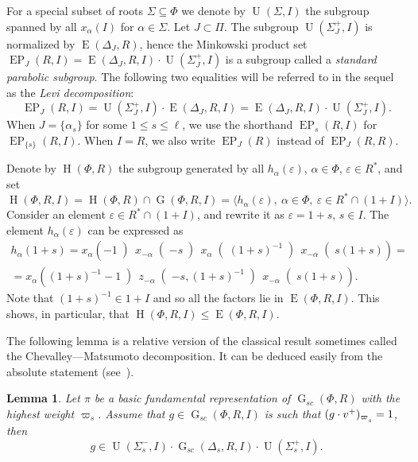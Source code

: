 \documentclass[oneside, 12pt]{amsart}
\theoremstyle{plain}
\numberwithin{equation}{section}
\newtheorem{lemma}{Lemma}
\numberwithin{lemma}{section}
\theoremstyle{definition}
\theoremstyle{remark}
\DeclareMathOperator{\G}{G}
\DeclareMathOperator{\E}{E}
\DeclareMathOperator{\EP}{EP}
\DeclareMathOperator{\Hh}{H}
\DeclareMathOperator{\U}{U}
\def\ssub#1{\mathchoice
   {_{\lower2pt\hbox{$\scriptstyle #1$}}}
   {_{\lower2pt\hbox{$\scriptstyle #1$}}}
   {_{\lower1.5pt\hbox{$\scriptscriptstyle #1$}}}
   {_{\!\lower1.5pt\hbox{$\scriptscriptstyle #1$}}}}
\begin{document}
For a special subset of roots $\Sigma\subseteq \Phi$ we denote by $\U(\Sigma, I)$ the subgroup spanned by all $x_{\alpha}(I)$ for $\alpha\in \Sigma$. Let $J\subset\Pi$.
The subgroup $\U(\Sigma_J^+, I)$ is normalized by $\E(\Delta_J, R)$, hence the Minkowski product set $\EP_J(R, I) = \E(\Delta_J, R, I) \cdot \U(\Sigma_J^+, I)$ is a subgroup called a \emph{standard parabolic subgroup}.
The following two equalities will be referred to in the sequel as the \emph{Levi decomposition}:
\begin{equation} \label{rel:Levi-decomp} \EP_J(R, I) = \U(\Sigma_J^+, I) \cdot \E(\Delta_J, R, I) = \E(\Delta_J, R, I) \cdot \U(\Sigma_J^+, I). \end{equation}
When $J = \{ \alpha_s \}$ for some $1 \leq s\leq \ell$, we use the shorthand $\EP_s(R, I)$ for $\EP_{\{s\}}(R, I)$.
When $I=R$, we also write $\EP_J(R)$ instead of $\EP_J(R, R)$.

Denote by $\Hh(\Phi, R)$ the subgroup generated by all $h_\alpha(\varepsilon)$, $\alpha\in\Phi$, $\varepsilon\in R^*$, and set
\[ \Hh(\Phi, R, I) = \Hh(\Phi, R)\cap\G(\Phi, R, I)=\langle h_\alpha(\varepsilon), \ \alpha\in\Phi, \ \varepsilon\in R^*\cap(1+I)\rangle. \]
Consider an element $\varepsilon\in R^*\cap(1+I)$, and rewrite it as $\varepsilon=1+s$, $s\in I$. The element $h_\alpha(\varepsilon)$ can be expressed as
\begin{multline} \label{eq:rel-tor-elementary}
h_\alpha(1+s) = x_\alpha\left(-1\middle)\, x_{-\alpha}\middle(-s\middle)\, x_\alpha\middle((1+s)^{-1}\middle)\, x_{-\alpha}\middle(s(1+s)\right) = \\
= x_\alpha\left((1+s)^{-1}-1\middle)\, z_{-\alpha}\middle(-s, (1+s)^{-1}\middle)\, x_{-\alpha}\middle(s(1+s)\right).
\end{multline}
Note that $(1+s)^{-1}\in 1+I$ and so all the factors lie in $\E(\Phi, R, I)$. This shows, in particular, that $\Hh(\Phi, R, I) \leqslant \E(\Phi, R, I)$.

The following lemma is a relative version of the classical result sometimes called the Chevalley---Matsumoto decomposition.
It can be deduced easily from the absolute statement (see~\cite[Theorem~1.3]{St78}).
\begin{lemma}\label{lemma:Chevalley-Matsumoto}
Let $\pi$ be a basic fundamental representation of $\G_{sc}(\Phi, R)$ with the highest weight $\varpi_s$.
Assume that $g\in \G_{sc}(\Phi, R, I)$ is such that $(g\cdot v^+)_{\varpi\ssub{s}}=1$, then 
\[ g \in \U(\Sigma_s^-, I) \cdot \G_{sc}(\Delta_s, R, I) \cdot \U(\Sigma_s^+, I). \]
\end{lemma}
\end{document}

